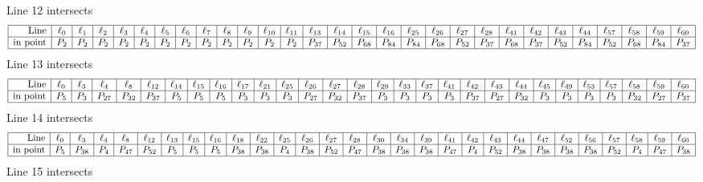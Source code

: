 \documentclass{article}
\begin{document}
{$$$$
Line 12 intersects 
$$
\begin{array}{|r*{28}{|c}|}
\hline
\mbox{Line}  & \ell_{0} & \ell_{1} & \ell_{2} & \ell_{3} & \ell_{4} & \ell_{5} & \ell_{6} & \ell_{7} & \ell_{8} & \ell_{9} & \ell_{10} & \ell_{11} & \ell_{13} & \ell_{14} & \ell_{15} & \ell_{16} & \ell_{25} & \ell_{26} & \ell_{27} & \ell_{28} & \ell_{41} & \ell_{42} & \ell_{43} & \ell_{44} & \ell_{57} & \ell_{58} & \ell_{59} & \ell_{60}\\
\hline
\mbox{in point}  & P_{2} & P_{2} & P_{2} & P_{2} & P_{2} & P_{2} & P_{2} & P_{2} & P_{2} & P_{2} & P_{2} & P_{2} & P_{37} & P_{52} & P_{68} & P_{84} & P_{84} & P_{68} & P_{52} & P_{37} & P_{68} & P_{37} & P_{52} & P_{84} & P_{52} & P_{68} & P_{84} & P_{37}\\
\hline
\end{array}
$$
Line 13 intersects 
$$
\begin{array}{|r*{28}{|c}|}
\hline
\mbox{Line}  & \ell_{0} & \ell_{3} & \ell_{4} & \ell_{8} & \ell_{12} & \ell_{14} & \ell_{15} & \ell_{16} & \ell_{17} & \ell_{21} & \ell_{25} & \ell_{26} & \ell_{27} & \ell_{28} & \ell_{29} & \ell_{33} & \ell_{37} & \ell_{41} & \ell_{42} & \ell_{43} & \ell_{44} & \ell_{45} & \ell_{49} & \ell_{53} & \ell_{57} & \ell_{58} & \ell_{59} & \ell_{60}\\
\hline
\mbox{in point}  & P_{5} & P_{3} & P_{27} & P_{32} & P_{37} & P_{5} & P_{5} & P_{5} & P_{3} & P_{3} & P_{3} & P_{27} & P_{32} & P_{37} & P_{3} & P_{3} & P_{3} & P_{3} & P_{37} & P_{27} & P_{32} & P_{3} & P_{3} & P_{3} & P_{3} & P_{32} & P_{27} & P_{37}\\
\hline
\end{array}
$$
Line 14 intersects 
$$
\begin{array}{|r*{28}{|c}|}
\hline
\mbox{Line}  & \ell_{0} & \ell_{3} & \ell_{4} & \ell_{8} & \ell_{12} & \ell_{13} & \ell_{15} & \ell_{16} & \ell_{18} & \ell_{22} & \ell_{25} & \ell_{26} & \ell_{27} & \ell_{28} & \ell_{30} & \ell_{34} & \ell_{39} & \ell_{41} & \ell_{42} & \ell_{43} & \ell_{44} & \ell_{47} & \ell_{52} & \ell_{56} & \ell_{57} & \ell_{58} & \ell_{59} & \ell_{60}\\
\hline
\mbox{in point}  & P_{5} & P_{38} & P_{4} & P_{47} & P_{52} & P_{5} & P_{5} & P_{5} & P_{38} & P_{38} & P_{4} & P_{38} & P_{52} & P_{47} & P_{38} & P_{38} & P_{38} & P_{47} & P_{4} & P_{52} & P_{38} & P_{38} & P_{38} & P_{38} & P_{52} & P_{4} & P_{47} & P_{38}\\
\hline
\end{array}
$$
Line 15 intersects 
$$
\begin{array}{|r*{28}{|c}|}

\end{array}$$}
\end{document}
